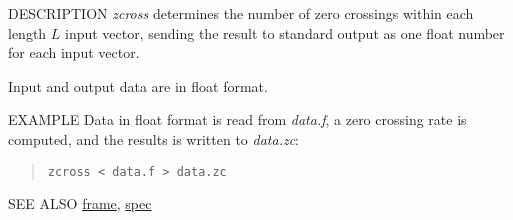 \begin{synopsis}
\item[zcross] [ --l $L$ ] [ --n ] [ {\em infile} ]
\end{synopsis}

\begin{qsection}{DESCRIPTION}
{\em zcross} determines the number of zero crossings 
within each length $L$ input vector, 
sending the result to standard output 
as one float number for each input vector.

Input and output data are in float format.
\end{qsection}

\begin{options}
\end{options}

\begin{qsection}{EXAMPLE}
Data in float format is read from {\em data.f},
a zero crossing rate is computed,
and the results is written to {\em data.zc}:
\begin{quote}
  \verb!zcross < data.f > data.zc!
\end{quote}
\end{qsection}

\begin{qsection}{SEE ALSO}
\hyperlink{frame}{frame},
\hyperlink{spec}{spec}
\end{qsection}
